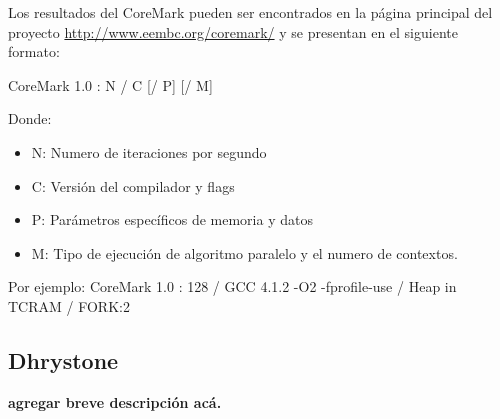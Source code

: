 Los resultados del CoreMark pueden ser encontrados en la página principal   
del proyecto \url{http://www.eembc.org/coremark/} y se presentan en el siguiente formato:
	
CoreMark 1.0 : N / C [/ P] [/ M]
	
Donde:
\begin{itemize}
\item N: Numero de iteraciones por segundo 
\item C: Versión del compilador y flags
\item P: Parámetros específicos de memoria y datos
\item M: Tipo de ejecución de algoritmo paralelo y el numero de contextos.
\end{itemize}	 
	
Por ejemplo: CoreMark 1.0 : 128 / GCC 4.1.2 -O2 -fprofile-use / Heap
in TCRAM / FORK:2
	
\subsection{Dhrystone}
 	
{\color{red}\textbf{agregar breve descripción acá.}}

